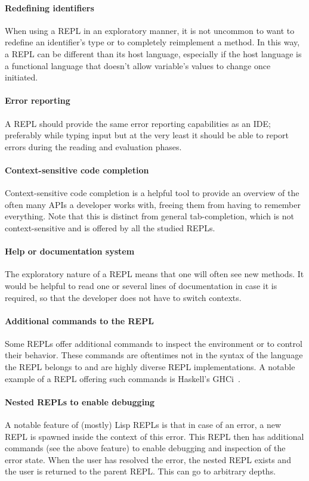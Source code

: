 \paragraph{Redefining identifiers} When using a REPL in an exploratory manner,
it is not uncommon to want to redefine an identifier's type or to completely
reimplement a method. In this way, a REPL can be different than its host
language, especially if the host language is a functional language that doesn't
allow variable's values to change once initiated.

\paragraph{Error reporting} A REPL should provide the same error reporting
capabilities as an IDE; preferably while typing input but at the very least it
should be able to report errors during the reading and evaluation phases.

\paragraph{Context-sensitive code completion} Context-sensitive code completion
is a helpful tool to provide an overview of the often many APIs a developer
works with, freeing them from having to remember everything. Note that this is
distinct from general tab-completion, which is not context-sensitive and is
offered by all the studied REPLs.

\paragraph{Help or documentation system} The exploratory nature of a REPL means
that one will often see new methods. It would be helpful to read one or several
lines of documentation in case it is required, so that the developer does not
have to switch contexts.

\paragraph{Additional commands to the REPL} Some REPLs offer additional
commands to inspect the environment or to control their behavior. These commands
are oftentimes not in the syntax of the language the REPL belongs to and are
highly diverse REPL implementations. A notable example of a REPL offering such
commands is Haskell's GHCi~\cite{GHCi-commands}.

\paragraph{Nested REPLs to enable debugging} A notable feature of (mostly) Lisp
REPLs is that in case of an error, a new REPL is spawned inside the context of
this error. This REPL then has additional commands (see the above feature) to
enable debugging and inspection of the error state. When the user has
resolved the error, the nested REPL exists and the user is returned to the
parent REPL. This can go to arbitrary depths.

